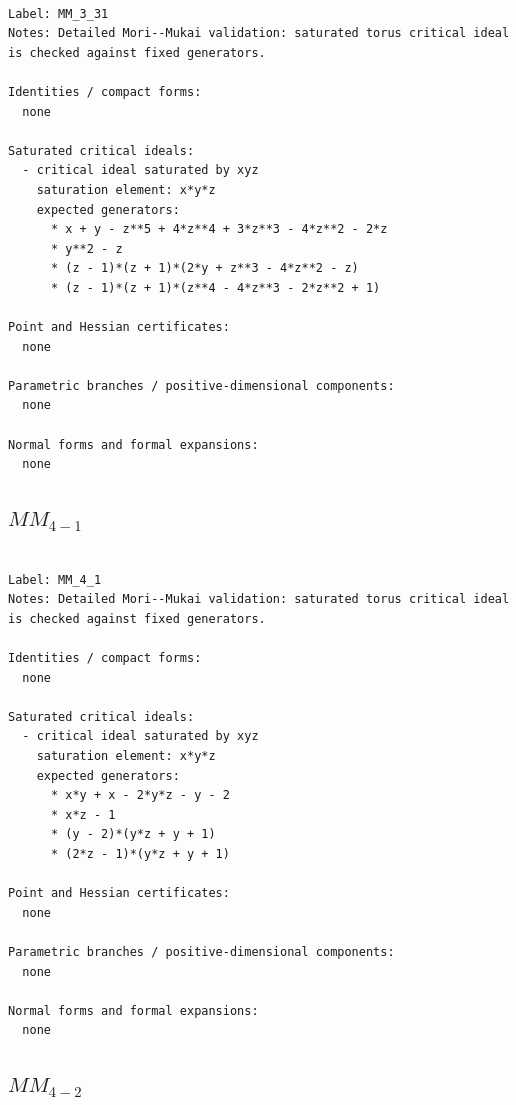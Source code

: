 \documentclass[10pt,a4paper]{article}
\begin{document}
\begin{lstlisting}

Label: MM_3_31
Notes: Detailed Mori--Mukai validation: saturated torus critical ideal is checked against fixed generators.

Identities / compact forms:
  none

Saturated critical ideals:
  - critical ideal saturated by xyz
    saturation element: x*y*z
    expected generators:
      * x + y - z**5 + 4*z**4 + 3*z**3 - 4*z**2 - 2*z
      * y**2 - z
      * (z - 1)*(z + 1)*(2*y + z**3 - 4*z**2 - z)
      * (z - 1)*(z + 1)*(z**4 - 4*z**3 - 2*z**2 + 1)

Point and Hessian certificates:
  none

Parametric branches / positive-dimensional components:
  none

Normal forms and formal expansions:
  none

\end{lstlisting}

\subsection*{$ MM_{4-1} $}

\begin{lstlisting}

Label: MM_4_1
Notes: Detailed Mori--Mukai validation: saturated torus critical ideal is checked against fixed generators.

Identities / compact forms:
  none

Saturated critical ideals:
  - critical ideal saturated by xyz
    saturation element: x*y*z
    expected generators:
      * x*y + x - 2*y*z - y - 2
      * x*z - 1
      * (y - 2)*(y*z + y + 1)
      * (2*z - 1)*(y*z + y + 1)

Point and Hessian certificates:
  none

Parametric branches / positive-dimensional components:
  none

Normal forms and formal expansions:
  none

\end{lstlisting}

\subsection*{$ MM_{4-2} $}
\end{document}
